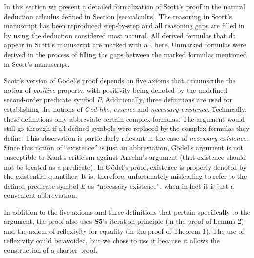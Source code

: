 \documentclass[smallextended]{svjour3}
\begin{document}
\setcounter{axiom}{0}
\setcounter{lemma}{0}
\setcounter{theorem}{0}
\setcounter{corollary}{0}
\setcounter{definition}{0}


\newcommand{\scott}{^{\dagger}}


In this section we present a detailed formalization of Scott's proof in the natural deduction calculus defined in Section \ref{sec:calculus}. The reasoning in Scott's manuscript has been reproduced step-by-step and all reasoning gaps are filled in by using the deduction considered most natural. All derived formulas that do appear in Scott's manuscript are marked with a $\dagger$ here. Unmarked formulas were derived in the process of filling the gaps between the marked formulas mentioned in Scott's manuscript. 


Scott's version of G\"odel's proof depends on five axioms that circumscribe the notion of \emph{positive} property, with positivity being denoted by the undefined second-order predicate symbol $P$. Additionally, three definitions are used for establishing the notions of \emph{God-like}, \emph{essence} and \emph{necessary existence}. Technically, these definitions only abbreviate certain complex formulas. The argument would still go through if all defined symbols were replaced by the complex formulas they define. This observation is particularly relevant in the case of \emph{necessary existence}. Since this notion of ``existence'' is just an abbreviation, G\"odel's argument is not susceptible to Kant's criticism against Anselm's argument (that existence should not be treated as a predicate). In G\"odel's proof, existence is properly denoted by the existential quantifier. It is, therefore, unfortunately misleading to refer to the defined predicate symbol $E$ as ``necessary existence'', when in fact it is just a convenient abbreviation.

In addition to the five axioms and three definitions that pertain specifically to the argument, the proof also uses {\bf S5}'s iteration principle (in the proof of Lemma 2) and the axiom of reflexivity for equality (in the proof of Theorem 1). The use of reflexivity could be avoided, but we chose to use it because it allows the construction of a shorter proof.
\end{document}

